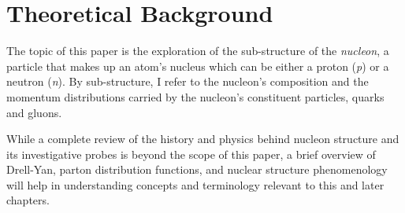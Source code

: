 \chapter{Theoretical Background}

The topic of this paper is the exploration of the sub-structure of the \emph{nucleon}, a particle that makes up an atom's nucleus which can be either a proton (\emph{p}) or a neutron (\emph{n}). By sub-structure, I refer to the nucleon's composition and the momentum distributions carried by the nucleon's constituent particles, quarks and gluons.

While a complete review of the history and physics behind nucleon structure and its investigative probes is beyond the scope of this paper, a brief overview of Drell-Yan, parton distribution functions, and nuclear structure phenomenology will help in understanding concepts and terminology relevant to this and later chapters.

